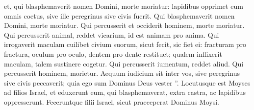 \begin{biblechapter}
\begin{biblechapter}
\begin{biblechapter}
\begin{biblechapter}
\begin{biblechapter}
\begin{biblechapter}
\begin{biblechapter}
\begin{biblechapter}
\begin{biblechapter}
\begin{biblechapter}
\begin{biblechapter}
\begin{biblechapter}
\begin{biblechapter}
\begin{biblechapter}
\begin{biblechapter}
\begin{biblechapter}
\begin{biblechapter}
\begin{biblechapter}
\begin{biblechapter}
\begin{biblechapter}
\begin{biblechapter}
\begin{biblechapter}
\begin{biblechapter}
\begin{biblechapter}
\verse et, qui blasphemaverit nomen Domini, morte moriatur: lapidibus opprimet eum omnis coetus, sive ille peregrinus sive civis fuerit. Qui blasphemaverit nomen Domini, morte moriatur.
 \verse Qui percusserit et occiderit hominem, morte moriatur.
 \verse Qui percusserit animal, reddet vicarium, id est animam pro anima.
 \verse Qui irrogaverit maculam cuilibet civium suorum, sicut fecit, sic fiet ei: 
 \verse fracturam pro fractura, oculum pro oculo, dentem pro dente restituet; qualem inflixerit maculam, talem sustinere cogetur.
 \verse Qui percusserit iumentum, reddet aliud. Qui percusserit hominem, morietur. 
 \verse Aequum iudicium sit inter vos, sive peregrinus sive civis peccaverit; quia ego sum Dominus Deus vester ”.
 \verse Locutusque est Moyses ad filios Israel, et eduxerunt eum, qui blasphemaverat, extra castra, ac lapidibus oppresserunt. Feceruntque filii Israel, sicut praeceperat Dominus Moysi.
 

\end{biblechapter}
\end{biblechapter}
\end{biblechapter}
\end{biblechapter}
\end{biblechapter}
\end{biblechapter}
\end{biblechapter}
\end{biblechapter}
\end{biblechapter}
\end{biblechapter}
\end{biblechapter}
\end{biblechapter}
\end{biblechapter}
\end{biblechapter}
\end{biblechapter}
\end{biblechapter}
\end{biblechapter}
\end{biblechapter}
\end{biblechapter}
\end{biblechapter}
\end{biblechapter}
\end{biblechapter}
\end{biblechapter}
\end{biblechapter}
